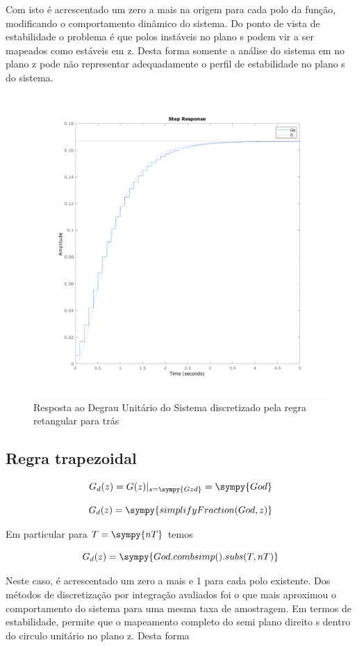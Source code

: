 \documentclass[a4paper,11pt]{article}
\begin{document}
Com isto é acrescentado um zero a mais na origem para cada polo da função, modificando o comportamento dinâmico do sistema. Do ponto de vista de estabilidade o problema é que polos instáveis no plano s podem vir a ser mapeados como estáveis em z. Desta forma somente a análise do sistema em no plano z pode não representar adequadamente o perfil de estabilidade no plano s do sistema.

\begin{figure}[H]
    \centering
    \includegraphics[width=0.8\linewidth]{img/exsim2-plot-g-backward.png}
    \caption{Resposta ao Degrau Unitário do Sistema discretizado pela regra retangular para trás}
\end{figure}

\subsection{Regra trapezoidal}

$$
    G_d(z) =  G(z)|_{s = \sympy{Gzd}} = \sympy{God}
$$

$$
    G_d(z) = \sympy{simplifyFraction(God,z)}
$$

Em particular para $T=\sympy{nT}$ temos

\begin{equation}
    G_d(z) = \sympy{God.combsimp().subs(T,nT)}
\end{equation}

Neste caso, é acrescentado um zero a mais e 1 para cada polo existente. Dos métodos de discretização por integração avaliados foi o que mais aproximou o comportamento do sistema para uma mesma taxa de amostragem. Em termos de estabilidade, permite que o mapeamento completo do semi plano direito s dentro do circulo unitário no plano z. Desta forma 
\end{document}
